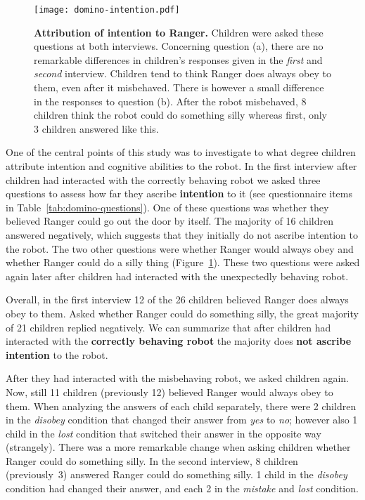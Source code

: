 \documentclass{sig-alternate}
\begin{document}
\begin{figure}[h]
    \centering
    \texttt{[image: domino-intention.pdf]}
    \caption{\small \textbf{Attribution of intention to Ranger.} Children were
        asked these questions at both interviews. Concerning question (a), there
        are no remarkable differences in children's responses given in the
        \textit{first} and \textit{second} interview.  Children tend to think
        Ranger does always obey to them, even after it misbehaved. There is
        however a small difference in the responses to question (b).  After the
        robot misbehaved, 8 children think the robot could do something silly whereas
        first, only 3 children answered like this.}
    
    \label{fig:domino-intention}

\end{figure}


One of the central points of this study was to investigate to what degree
children attribute intention and cognitive abilities to the robot.  In the first
interview after children had interacted with the correctly behaving robot we
asked three questions to assess how far they ascribe \textbf{intention} to it
(see questionnaire items in Table~\ref{tab:domino-questions}). One of these
questions was whether they believed Ranger could go out the door by itself. The
majority of 16 children answered negatively, which suggests that they initially
do not ascribe intention to the robot. The two other questions were whether
Ranger would always obey and whether Ranger could do a silly thing
(Figure~\ref{fig:domino-intention}). These two questions were asked again later
after children had interacted with the unexpectedly behaving robot.


Overall, in the first interview 12 of the 26 children believed Ranger does
always obey to them. Asked whether Ranger could do something silly, the great
majority of 21 children replied negatively. We can summarize that after children
had interacted with the \textbf{correctly behaving robot} the majority does
\textbf{not ascribe intention} to the robot.

After they had interacted with the misbehaving robot, we asked children again.
Now, still 11 children (previously 12) believed Ranger would always obey to
them. When analyzing the answers of each child separately, there were 2 children
in the \textit{disobey} condition that changed their answer from \textit{yes} to
\textit{no}; however also 1 child in the \textit{lost} condition that switched
their answer in the opposite way (strangely). There was a more remarkable change
when asking children whether Ranger could do something silly. In the second
interview, 8 children (previously~3) answered Ranger could do something silly. 1
child in the \textit{disobey} condition had changed their answer, and each 2 in
the \textit{mistake} and \textit{lost} condition. 
\end{document}
